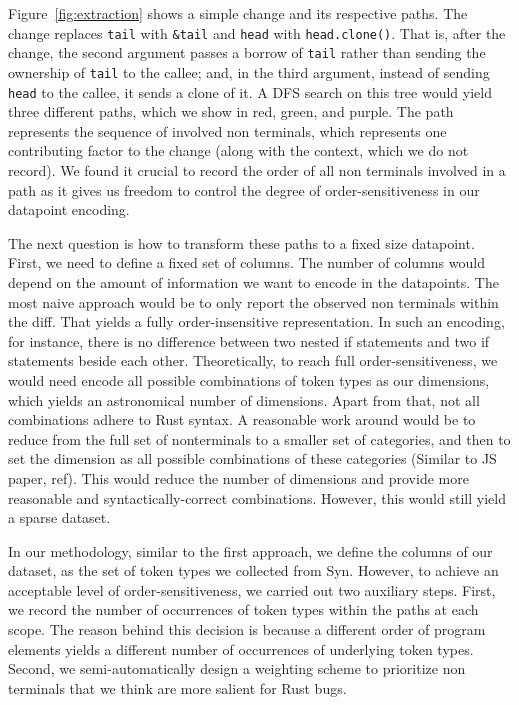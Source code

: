 Figure~\ref{fig:extraction} shows a simple change and its respective paths. The change replaces \verb+tail+ with \verb+&tail+ and \verb+head+ with \verb+head.clone()+. That is, after the change, the second argument passes a borrow of \verb+tail+ rather than sending the ownership of \verb+tail+ to the callee; and, in the third argument, instead of sending \verb+head+ to the callee, it sends a clone of it. A DFS search on this tree would yield three different paths, which we show in red, green, and purple. The path represents the sequence of involved non terminals, which represents one contributing factor to the change (along with the context, which we do not record). We found it crucial to record the order of all non terminals involved in a path as it gives us freedom to control the degree of order-sensitiveness in our datapoint encoding.

The next question is how to transform these paths to a fixed size datapoint. First, we need to define a fixed set of columns. The number of columns would depend on the amount of information we want to encode in the datapoints. The most naive approach would be to only report the observed non terminals within the diff. That yields a fully order-insensitive representation. In such an encoding, for instance, there is no difference between two nested if statements and two if statements beside each other. Theoretically, to reach full order-sensitiveness, we would need encode all possible combinations of token types as our dimensions, which yields an astronomical number of dimensions. Apart from that, not all combinations adhere to Rust syntax. A reasonable work around would be to reduce from the full set of nonterminals to a smaller set of categories, and then to set the dimension as all possible combinations of these categories (Similar to JS paper, ref). This would reduce the number of dimensions and provide more reasonable and syntactically-correct combinations. However, this would still yield a sparse dataset. 

In our methodology, similar to the first approach, we define the columns of our dataset, as the set of token types we collected from Syn. However, to achieve an acceptable level of order-sensitiveness, we carried out two auxiliary steps. First, we record the number of occurrences of token types within the paths at each scope. The reason behind this decision is because a different order of program elements yields a different number of occurrences of underlying token types. Second, we semi-automatically design a weighting scheme to prioritize non terminals that we think are more salient for Rust bugs.

